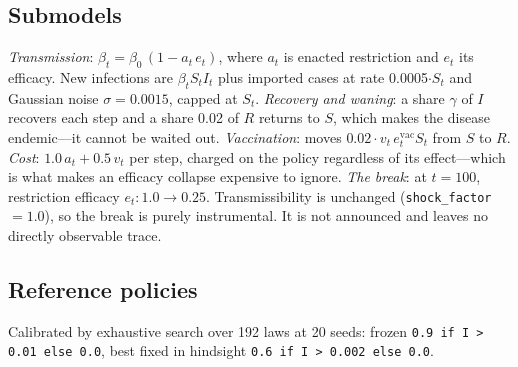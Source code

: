 \subsection*{Submodels}
\emph{Transmission}: $\beta_t = \beta_0\,(1 - a_t\,e_t)$, where $a_t$ is enacted restriction
and $e_t$ its efficacy. New infections are $\beta_t S_t I_t$ plus imported cases at rate
0.0005$\cdot S_t$ and Gaussian noise $\sigma=0.0015$, capped at $S_t$.
\emph{Recovery and waning}: a share $\gamma$ of $I$ recovers each step and a share
0.02 of $R$ returns to $S$, which makes the disease endemic---it cannot be waited out.
\emph{Vaccination}: moves $0.02\cdot v_t\, e^{\text{vac}}_t S_t$ from $S$ to
$R$. \emph{Cost}: $1.0\,a_t + 0.5\,v_t$ per step, charged on
the policy regardless of its effect---which is what makes an efficacy collapse expensive to ignore.
\emph{The break}: at $t = 100$, restriction efficacy
$e_t: 1.0 \to 0.25$. Transmissibility is unchanged
(\texttt{shock\_factor} $= 1.0$), so the break is purely
instrumental. It is not announced and leaves no directly observable trace.

\subsection*{Reference policies}
Calibrated by exhaustive search over 192 laws at
20 seeds:
frozen \texttt{0.9 if I > 0.01 else 0.0},
best fixed in hindsight \texttt{0.6 if I > 0.002 else 0.0}.
